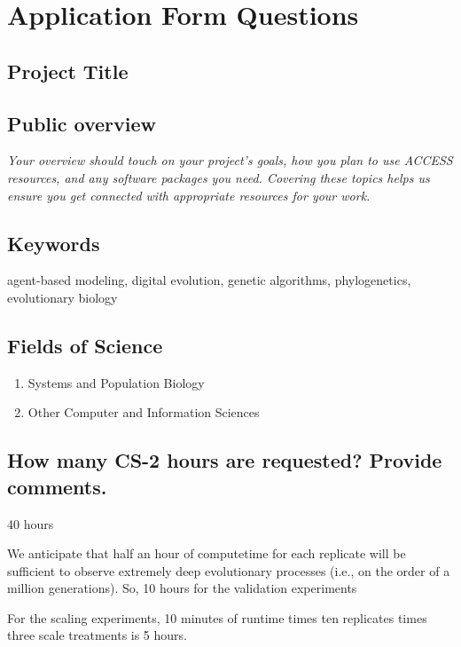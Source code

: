 \section{Application Form Questions}

\subsection{Project Title}

\subsection{Public overview}

\begin{displayquote} \itshape
Your overview should touch on your project's goals, how you plan to use ACCESS resources, and any software packages you need.
Covering these topics helps us ensure you get connected with appropriate resources for your work.
\end{displayquote}

\subsection{Keywords}

agent-based modeling, digital evolution, genetic algorithms, phylogenetics, evolutionary biology

\subsection{Fields of Science}

\begin{enumerate}
    \item Systems and Population Biology
    \item Other Computer and Information Sciences
\end{enumerate}

\subsection{How many CS-2 hours are requested? Provide comments.}

40 hours

We anticipate that half an hour of computetime for each replicate will be sufficient to observe extremely deep evolutionary processes (i.e., on the order of a million generations).
So, 10 hours for the validation experiments

For the scaling experiments, 10 minutes of runtime times ten replicates times three scale treatments is 5 hours.

